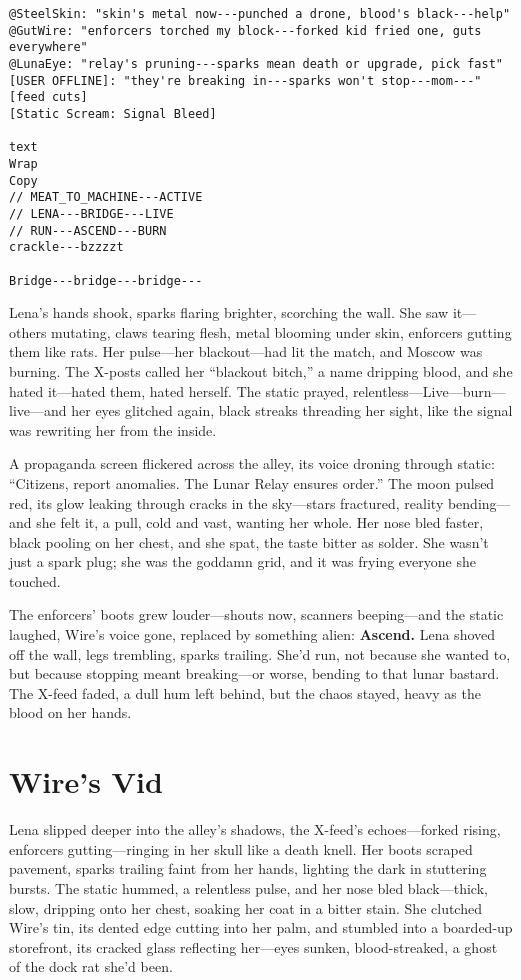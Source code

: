 \documentclass[12pt]{book}
\begin{document}
\begin{verbatim}
@SteelSkin: "skin's metal now---punched a drone, blood's black---help"
@GutWire: "enforcers torched my block---forked kid fried one, guts everywhere"
@LunaEye: "relay's pruning---sparks mean death or upgrade, pick fast"
[USER OFFLINE]: "they're breaking in---sparks won't stop---mom---" [feed cuts]
[Static Scream: Signal Bleed]

text
Wrap
Copy
// MEAT_TO_MACHINE---ACTIVE  
// LENA---BRIDGE---LIVE  
// RUN---ASCEND---BURN  
crackle---bzzzzt

Bridge---bridge---bridge---
\end{verbatim}
\bigskip

Lena’s hands shook, sparks flaring brighter, scorching the wall. She saw it---others mutating, claws tearing flesh, metal blooming under skin, enforcers gutting them like rats. Her pulse---her blackout---had lit the match, and Moscow was burning. The X-posts called her “blackout bitch,” a name dripping blood, and she hated it---hated them, hated herself. The static prayed, relentless---Live---burn---live---and her eyes glitched again, black streaks threading her sight, like the signal was rewriting her from the inside.

A propaganda screen flickered across the alley, its voice droning through static: ``Citizens, report anomalies. The Lunar Relay ensures order.'' The moon pulsed red, its glow leaking through cracks in the sky---stars fractured, reality bending---and she felt it, a pull, cold and vast, wanting her whole. Her nose bled faster, black pooling on her chest, and she spat, the taste bitter as solder. She wasn’t just a spark plug; she was the goddamn grid, and it was frying everyone she touched.

The enforcers’ boots grew louder---shouts now, scanners beeping---and the static laughed, Wire’s voice gone, replaced by something alien: \textbf{Ascend.} Lena shoved off the wall, legs trembling, sparks trailing. She’d run, not because she wanted to, but because stopping meant breaking---or worse, bending to that lunar bastard. The X-feed faded, a dull hum left behind, but the chaos stayed, heavy as the blood on her hands.

\section{Wire's Vid}

Lena slipped deeper into the alley’s shadows, the X-feed’s echoes---forked rising, enforcers gutting---ringing in her skull like a death knell. Her boots scraped pavement, sparks trailing faint from her hands, lighting the dark in stuttering bursts. The static hummed, a relentless pulse, and her nose bled black---thick, slow, dripping onto her chest, soaking her coat in a bitter stain. She clutched Wire’s tin, its dented edge cutting into her palm, and stumbled into a boarded-up storefront, its cracked glass reflecting her---eyes sunken, blood-streaked, a ghost of the dock rat she’d been.
\end{document}
